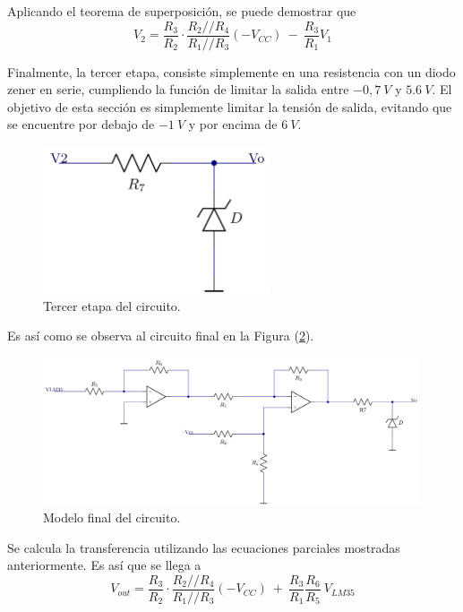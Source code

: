\documentclass[a4paper]{article}
\begin{document}
Aplicando el teorema de superposición, se puede demostrar que
\[
	V_2 = \frac{R_3}{R_2} \cdot \frac{R_2 // R_4}{R_1 // R_3} \left( -V_{CC} \right) \ - \ \frac{R_3}{R_1} V_1
\]

Finalmente, la tercer etapa, consiste simplemente en una resistencia con un diodo zener en serie, cumpliendo la función de limitar la salida entre $-0,7 \ V$ y $5.6 \ V$. El objetivo de esta sección es simplemente limitar la tensión de salida, evitando que se encuentre por debajo de $-1 \ V$ y por encima de $6 \ V$.

\begin{figure}[H]
	\centering
	\includegraphics[width=0.6\textwidth]{Ejercicio6/Imagenes/CircuitoEtapa3-M1.png}
	\caption{Tercer etapa del circuito.}
	\label{fig:cir3}
\end{figure}

Es así como se observa al circuito final en la Figura (\ref{fig:cirfin-M1}).

\begin{figure}[H]
	\centering
	\includegraphics[width=0.99\textwidth]{Ejercicio6/Imagenes/CircuitoFinal-M1.png}
	\caption{Modelo final del circuito.}
	\label{fig:cirfin-M1}
\end{figure}

Se calcula la transferencia utilizando las ecuaciones parciales mostradas anteriormente. Es así que se llega a
\begin{equation}
	V_{out} = \frac{R_3}{R_2} \cdot \frac{R_2 // R_4}{R_1 // R_3} \left( -V_{CC} \right) \ + \
	\frac{R_3}{R_1} \frac{R_6}{R_5} \ V_{LM35}
	\label{equ:transfm1}
\end{equation}
\end{document}

